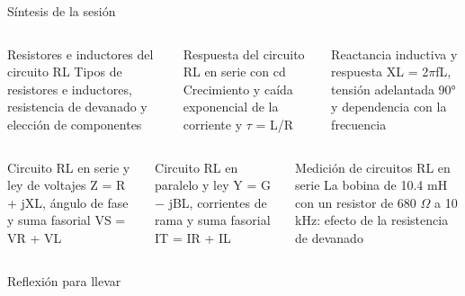 \documentclass[aspectratio=169,11pt,xcolor={table}]{beamer}
\begin{document}
\begin{frame}{Síntesis de la sesión}
\begin{columns}[T,onlytextwidth]
\begin{cardB}{Resistores e inductores del circuito RL}
\scriptsize Tipos de resistores e inductores, resistencia de devanado y elección de componentes
\end{cardB}
\begin{cardO}{Respuesta del circuito RL en serie con cd}
\scriptsize Crecimiento y caída exponencial de la corriente y \ensuremath{\tau} = L/R
\end{cardO}
\begin{cardG}{Reactancia inductiva y respuesta}
\scriptsize XL = 2\ensuremath{\pi}fL, tensión adelantada 90° y dependencia con la frecuencia
\end{cardG}
\end{columns}
\vspace{2mm}
\begin{columns}[T,onlytextwidth]
\begin{cardB}{Circuito RL en serie y ley de voltajes}
\scriptsize Z = R + jXL, ángulo de fase y suma fasorial VS = VR + VL
\end{cardB}
\begin{cardO}{Circuito RL en paralelo y ley}
\scriptsize Y = G \ensuremath{-} jBL, corrientes de rama y suma fasorial IT = IR + IL
\end{cardO}
\begin{cardG}{Medición de circuitos RL en serie}
\scriptsize La bobina de 10.4 mH con un resistor de 680 \ensuremath{\Omega} a 10 kHz: efecto de la resistencia de devanado
\end{cardG}
\end{columns}
\end{frame}

\begin{frame}{Reflexión para llevar}
\centering
{}
\end{frame}
\end{document}
